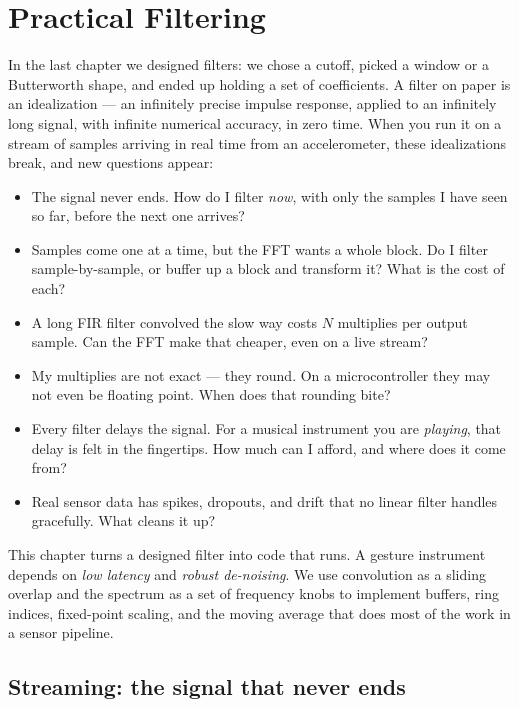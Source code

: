 \chapter{Practical Filtering}

In the last chapter we designed filters: we chose a cutoff, picked a window or a
Butterworth shape, and ended up holding a set of coefficients. A filter on paper is an idealization ---
an infinitely precise impulse response, applied to an infinitely long signal,
with infinite numerical accuracy, in zero time. When you run it on a stream of samples
arriving in real time from an accelerometer, these idealizations break, and new questions appear:

\begin{itemize}
  \item The signal never ends. How do I filter \emph{now}, with only the
        samples I have seen so far, before the next one arrives?
  \item Samples come one at a time, but the FFT wants a whole block. Do I
        filter sample-by-sample, or buffer up a block and transform it? What is
        the cost of each?
  \item A long FIR filter convolved the slow way costs $N$ multiplies per output
        sample. Can the FFT make that cheaper, even on a live stream?
  \item My multiplies are not exact --- they round. On a microcontroller they
        may not even be floating point. When does that rounding bite?
  \item Every filter delays the signal. For a musical instrument you are
        \emph{playing}, that delay is felt in the fingertips. How much can I
        afford, and where does it come from?
  \item Real sensor data has spikes, dropouts, and drift that no linear filter
        handles gracefully. What cleans it up?
\end{itemize}

This chapter turns a designed filter into code that runs. A gesture instrument depends on \emph{low latency}
and \emph{robust de-noising}. We use convolution as a sliding overlap and the
spectrum as a set of frequency knobs to implement
buffers, ring indices, fixed-point scaling, and the moving average that
does most of the work in a sensor pipeline.

\section{Streaming: the signal that never ends}
\label{ch17:streaming}

